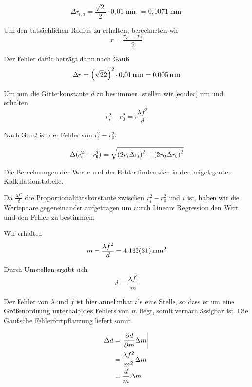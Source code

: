 \documentclass[a4paper,german,12pt,smallheadings]{scrartcl}
\begin{document}
\begin{equation}
  \Delta r_{i,a} = \frac{\sqrt{2}}{2} \cdot 0{,}01 \operatorname{mm} = 0{,}0071
  \operatorname{mm}
\end{equation}

Um den tatsächlichen Radius zu erhalten, berechneten wir
\begin{equation}
  r = \frac{r_a - r_i}{2}
\end{equation}

Der Fehler dafür beträgt dann nach Gauß
\begin{equation}
  \Delta r = \del{\sqrt{2}{2}}^2 \cdot 0{,}01 \operatorname{mm} = 0{,}005 \operatorname{mm}
\end{equation}

Um nun die Gitterkonstante $d$ zu bestimmen, stellen wir \ref{eq:deq} um und erhalten
\begin{equation}
  r_i^2 - r_0^2 = i \frac{\lambda f^2}{d}
\end{equation}

Nach Gauß ist der Fehler von $r_i^2 - r_0^2$:

\begin{align*}
  \Delta(r_i^2 - r_0^2) = \sqrt{\del{2 r_i \Delta r_i}^2 + \del{2 r_0 \Delta r_0}^2}
\end{align*}

Die Berechnungen der Werte und der Fehler finden sich in der beigelegenten
Kalkulationstabelle.

Da $\frac{\lambda f^2}{d}$ die Proportionalitätskonstante zwischen
$r_i^2 - r_0^2$ und $i$ ist, haben wir die Wertepaare gegeneinander aufgetragen
um durch Lineare Regression den Wert und den Fehler zu bestimmen.

Wir erhalten
\begin{equation}
  m = \frac{\lambda f^2}{d} = \num{4.132\pm0.031} \operatorname{mm}^2
\end{equation}

Durch Umstellen ergibt sich
\begin{equation}
  d = \frac{\lambda f^2}{m}
\end{equation}

Der Fehler von $\lambda$ und $f$ ist hier annehmbar als eine Stelle, so dass er
um eine Größenordnung unterhalb des Fehlers von $m$ liegt, somit
vernachlässigbar ist. Die Gaußsche Fehlerfortpflanzung liefert somit

\begin{align*}
  \Delta d &= \envert{\frac{\partial d}{\partial m} \Delta m} \\
           &= \frac{\lambda f^2}{m^2} \Delta m \\
           &= \frac{d}{m} \Delta m
\end{align*}
\end{document}
